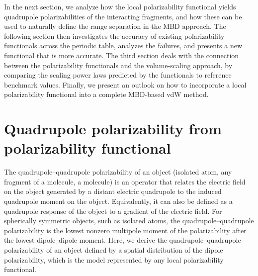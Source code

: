 In the next section, we analyze how the local polarizability functional yields quadrupole polarizabilities of the interacting fragments, and how these can be used to naturally define the range separation in the MBD approach.
The following section then investigates the accuracy of existing polarizability functionals across the periodic table, analyzes the failures, and presents a new functional that is more accurate.
The third section deals with the connection between the polarizability functionals and the volume-scaling approach, by comparing the scaling power laws predicted by the functionals to reference benchmark values.
Finally, we present an outlook on how to incorporate a local polarizability functional into a complete MBD-based vdW method.

\section{Quadrupole polarizability from polarizability functional}\label{sec:quadrupole}

The quadrupole--quadrupole polarizability of an object (isolated atom, any fragment of a molecule, a molecule) is an operator that relates the electric field on the object generated by a distant electric quadrupole to the induced quadrupole moment on the object.
Equivalently, it can also be defined as a quadrupole response of the object to a gradient of the electric field.
For spherically symmetric objects, such as isolated atoms, the quadrupole--quadrupole polarizability is the lowest nonzero multipole moment of the polarizability after the lowest dipole--dipole moment.
Here, we derive the quadrupole--quadrupole polarizability of an object defined by a spatial distribution of the dipole polarizability, which is the model represented by any local polarizability functional.

